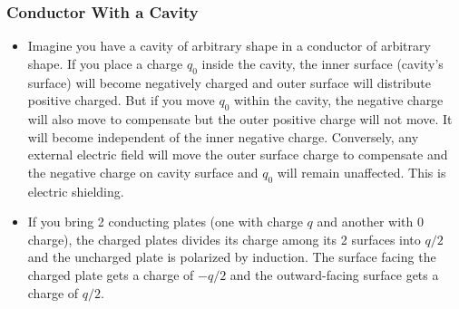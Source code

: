 \documentclass{scrartcl}
\begin{document}
    \subsubsection{Conductor With a Cavity}
    \begin{itemize}
        \item Imagine you have a cavity of arbitrary shape in a conductor of arbitrary shape. If you place a charge $q_0$ inside the cavity, the inner surface (cavity's surface) will become negatively charged and outer surface will distribute positive charged. But if you move $q_0$ within the cavity, the negative charge will also move to compensate but the outer positive charge will not move. It will become independent of the inner negative charge. Conversely, any external electric field will move the outer surface charge to compensate and the negative charge on cavity surface and $q_0$ will remain unaffected. This is electric shielding.
        \item If you bring 2 conducting plates (one with charge $q$ and another with 0 charge), the charged plates divides its charge among its 2 surfaces into $q/2$ and the uncharged plate is polarized by induction. The surface facing the charged plate gets a charge of $-q/2$ and the outward-facing surface gets a charge of $q/2$.
    \end{itemize}
\end{document}
